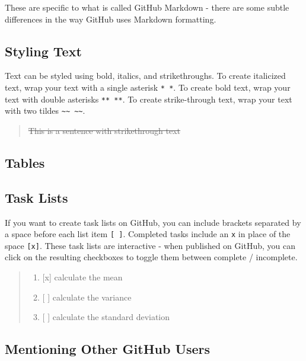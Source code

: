 \documentclass[]{book}
\providecommand{\tightlist}{%
  \setlength{\itemsep}{0pt}\setlength{\parskip}{0pt}}
\theoremstyle{definition}
\theoremstyle{definition}
\theoremstyle{definition}
\theoremstyle{remark}
\begin{document}
These are specific to what is called GitHub Markdown - there are some
subtle differences in the way GitHub uses Markdown formatting.

\subsection{Styling Text}\label{styling-text-1}

Text can be styled using bold, italics, and strikethroughs. To create
italicized text, wrap your text with a single asterisk \texttt{*\ *}. To
create bold text, wrap your text with double asterisks \texttt{**\ **}.
To create strike-through text, wrap your text with two tildes
\texttt{\textasciitilde{}\textasciitilde{}\ \textasciitilde{}\textasciitilde{}}.

\begin{quote}
\sout{This is a sentence with strikethrough text}
\end{quote}

\subsection{Tables}\label{tables}

\subsection{Task Lists}\label{task-lists}

If you want to create task lists on GitHub, you can include brackets
separated by a space before each list item \texttt{{[}\ {]}}. Completed
tasks include an \texttt{x} in place of the space \texttt{{[}x{]}}.
These task lists are interactive - when published on GitHub, you can
click on the resulting checkboxes to toggle them between complete /
incomplete.

\begin{quote}
\begin{enumerate}
\def\labelenumi{\arabic{enumi}.}
\tightlist
\item
  {[}x{]} calculate the mean
\item
  {[} {]} calculate the variance
\item
  {[} {]} calculate the standard deviation
\end{enumerate}
\end{quote}

\subsection{Mentioning Other GitHub
Users}\label{mentioning-other-github-users}
\end{document}
